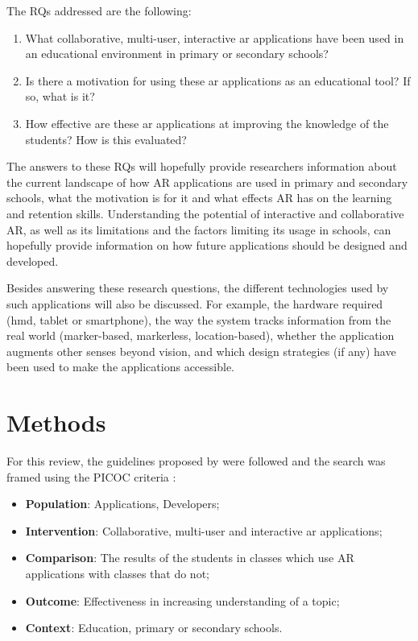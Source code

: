 The \glspl{RQ} addressed are the following:
\begin{enumerate}[start=1,label={\bfseries RQ\arabic*:}]
    \item What collaborative, multi-user, interactive \gls{ar} applications have been used in an educational environment in primary or secondary schools?
    \item Is there a motivation for using these \gls{ar} applications as an educational tool? If so, what is it?
    \item How effective are these \gls{ar} applications at improving the knowledge of the students? How is this evaluated?
\end{enumerate}

The answers to these RQs will hopefully provide researchers information about the current landscape of how AR applications are used in primary and secondary schools, what  the motivation is for it and what effects AR has on the learning and retention skills. Understanding the potential of interactive and collaborative AR, as well as its limitations and the factors limiting its usage in schools, can hopefully provide information on how future applications should be designed and developed.

Besides answering these research questions, the different technologies used by such applications will also be discussed. For example, the hardware required (\gls{hmd}, tablet or smartphone), the way the system tracks information from the real world (marker-based, markerless, location-based), whether the application augments other senses beyond vision, and which design strategies (if any) have been used to make the applications accessible.

\section{Methods}\label{sota:methods}
For this review, the guidelines proposed by \cite{kitchenham2009systematic} were followed and the search was framed using the PICOC criteria \citep{petticrew2008systematic}:
\begin{itemize}
    \item \textbf{Population}: Applications, Developers;
    \item \textbf{Intervention}: Collaborative, multi-user and interactive \gls{ar} applications;
    \item \textbf{Comparison}: The results of the students in classes which use AR applications with classes that do not;
    \item \textbf{Outcome}: Effectiveness in increasing understanding of a topic;
    \item \textbf{Context}: Education, primary or secondary schools.
\end{itemize}

